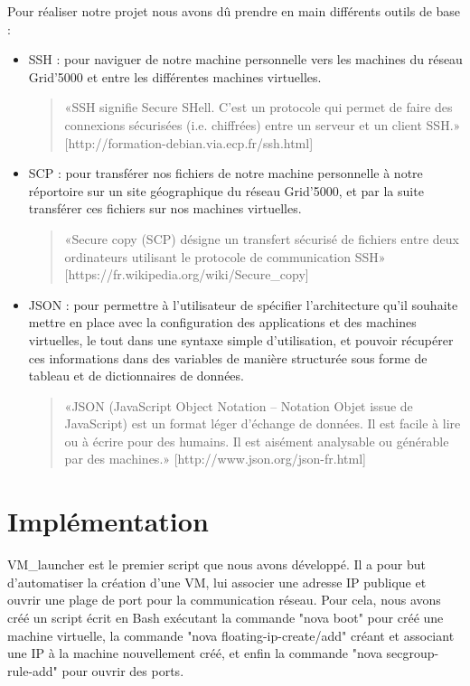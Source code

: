 \documentclass{report}
\begin{document}
    Pour réaliser notre projet nous avons dû prendre en main différents outils de base :
    \begin{itemize}
        \item SSH : pour naviguer de notre machine personnelle vers les machines du réseau Grid'5000 et entre les différentes machines virtuelles.
        \begin{quote}
            «SSH signifie Secure SHell. C'est un protocole qui permet de faire des connexions sécurisées (i.e. chiffrées) entre un serveur et un client SSH.»
            [http://formation-debian.via.ecp.fr/ssh.html]
        \end{quote}
        \item SCP : pour transférer nos fichiers de notre machine personnelle à notre réportoire sur un site géographique du réseau Grid'5000, et par la suite transférer ces fichiers sur nos machines virtuelles.
        \begin{quote}
            «Secure copy (SCP) désigne un transfert sécurisé de fichiers entre deux ordinateurs utilisant le protocole de communication SSH»
            [https://fr.wikipedia.org/wiki/Secure\_copy]
        \end{quote}
        \item JSON : pour permettre à l'utilisateur de spécifier l'architecture qu'il souhaite mettre en place avec la configuration des applications et des machines virtuelles, le tout dans une syntaxe simple d'utilisation, et pouvoir récupérer ces informations dans des variables de manière structurée sous forme de tableau et de dictionnaires de données. 
        \begin{quote}
            «JSON (JavaScript Object Notation – Notation Objet issue de JavaScript) est un format léger d'échange de données. Il est facile à lire ou à écrire pour des humains. Il est aisément analysable ou générable par des machines.»
            [http://www.json.org/json-fr.html]
        \end{quote}
    \end{itemize}


    \section{Implémentation}



VM\_launcher est le premier script que nous avons développé. Il a pour but d'automatiser la création d'une VM, lui associer une adresse IP publique et ouvrir une plage de port pour la communication réseau. Pour cela, nous avons créé un script écrit en Bash exécutant la commande "nova boot" pour créé une machine virtuelle, la commande "nova floating-ip-create/add" créant et associant une IP à la machine nouvellement créé, et enfin la commande "nova secgroup-rule-add" pour ouvrir des ports.\bigbreak
\end{document}
